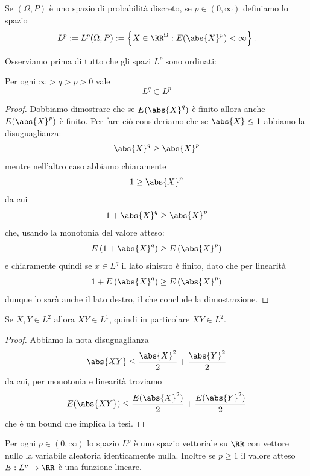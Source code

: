 \documentclass[11pt]{scrartcl}
\begin{document}
	\begin{definition}[Spazio $L^p$]
		Se $(\Omega,P)$ è uno spazio di probabilità discreto, se $p\in (0,\infty)$ definiamo lo spazio 
		$$L^p:=L^p(\Omega,P):=\left\{X\in \RR^\Omega:E(\abs{X}^p)<\infty\right\}.$$
	\end{definition}
	Osserviamo prima di tutto che gli spazi $L^p$ sono ordinati:
	\begin{lemma}
		Per ogni $\infty>q>p>0$ vale
		$$L^q\subset L^p$$ 
	\end{lemma}
	\begin{proof}
		Dobbiamo dimostrare che se $E(\abs{X}^q)$ è finito allora anche $E(\abs{X}^p)$ è finito. Per fare ciò consideriamo che se $\abs{X}\le 1$ abbiamo la disuguaglianza:
		$$\abs{X}^q\ge\abs{X}^p $$
		mentre nell'altro caso abbiamo chiaramente
		$$1\ge \abs{X}^p$$
		da cui
		$$1+\abs{X}^q\ge \abs{X}^p$$
		che, usando la monotonia del valore atteso:
		$$E\left(1+\abs{X}^q\right)\ge E\left(\abs{X}^p\right)$$
		e chiaramente quindi se $x\in L^q$ il lato sinistro è finito, dato che per linearità
		$$1+E\left(\abs{X}^q\right)\ge E\left(\abs{X}^p\right)$$
		dunque lo sarà anche il lato destro, il che conclude la dimostrazione.
	\end{proof}
	\begin{proposition}[Prodotto in $L^2$]
		Se $X,Y\in L^2$ allora $XY\in L^1$, quindi in particolare $XY\in L^2$.
	\end{proposition}
	\begin{proof}
		Abbiamo la nota disuguaglianza
		$$\abs{XY}\le \frac{\abs{X}^2}{2}+\frac{\abs{Y}^2}{2}$$
		da cui, per monotonia e linearità troviamo
		$$E(\abs{XY})\le \frac{E(\abs{X}^2)}{2}+\frac{E(\abs{Y}^2)}{2}$$
		che è un bound che implica la tesi.
	\end{proof}
	\begin{lemma}
		Per ogni $p\in(0,\infty)$ lo spazio $L^p$ è uno spazio vettoriale su $\RR$ con vettore nullo la variabile aleatoria identicamente nulla. Inoltre se $p\ge 1$ il valore atteso $E:L^p\to \RR$ è una funzione lineare.
	\end{lemma}
\end{document}

